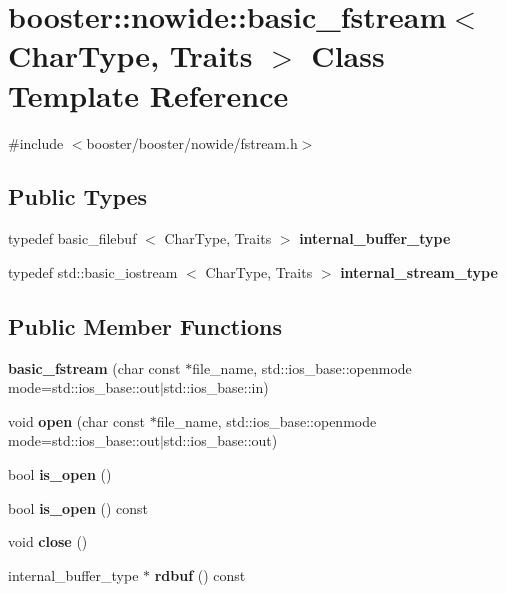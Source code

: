 \section{booster\-:\-:nowide\-:\-:basic\-\_\-fstream$<$ \-Char\-Type, \-Traits $>$ \-Class \-Template \-Reference}
\label{classbooster_1_1nowide_1_1basic__fstream}


{\ttfamily \#include $<$booster/booster/nowide/fstream.\-h$>$}

\subsection*{\-Public \-Types}
\begin{DoxyCompactItemize}
\item 
typedef basic\-\_\-filebuf\*
$<$ \-Char\-Type, \-Traits $>$ {\bfseries internal\-\_\-buffer\-\_\-type}\label{classbooster_1_1nowide_1_1basic__fstream_a34fd09bc911e53133f4d38e251d6c6e7}

\item 
typedef std\-::basic\-\_\-iostream\*
$<$ \-Char\-Type, \-Traits $>$ {\bfseries internal\-\_\-stream\-\_\-type}\label{classbooster_1_1nowide_1_1basic__fstream_a7644af06e695c66947a515214ae17820}

\end{DoxyCompactItemize}
\subsection*{\-Public \-Member \-Functions}
\begin{DoxyCompactItemize}
\item 
{\bfseries basic\-\_\-fstream} (char const $\ast$file\-\_\-name, std\-::ios\-\_\-base\-::openmode mode=std\-::ios\-\_\-base\-::out$|$std\-::ios\-\_\-base\-::in)\label{classbooster_1_1nowide_1_1basic__fstream_a19bf2f035f508e8912dd7ca2226aa3ac}

\item 
void {\bfseries open} (char const $\ast$file\-\_\-name, std\-::ios\-\_\-base\-::openmode mode=std\-::ios\-\_\-base\-::out$|$std\-::ios\-\_\-base\-::out)\label{classbooster_1_1nowide_1_1basic__fstream_a8bd6973e1d307904b913838db1601fe1}

\item 
bool {\bfseries is\-\_\-open} ()\label{classbooster_1_1nowide_1_1basic__fstream_aa935f6d90db9050d7d7d41ff92600495}

\item 
bool {\bfseries is\-\_\-open} () const \label{classbooster_1_1nowide_1_1basic__fstream_a51b8ed3cbf427146d8396c70a68726e8}

\item 
void {\bfseries close} ()\label{classbooster_1_1nowide_1_1basic__fstream_ad07239315e831d3be0d6468e6e1d964a}

\item 
internal\-\_\-buffer\-\_\-type $\ast$ {\bfseries rdbuf} () const \label{classbooster_1_1nowide_1_1basic__fstream_ac60c9e9e38d4fbd030c30be89b5a1b62}

\end{DoxyCompactItemize}


